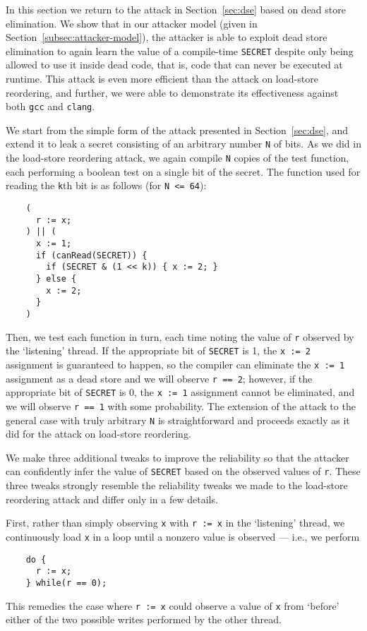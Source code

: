In this section we return to the attack in Section~\ref{sec:dse} based on
dead store elimination.
We show that in our attacker model (given in
Section~\ref{subsec:attacker-model}), the attacker is able to exploit dead
store elimination to again learn the value of a compile-time \verb|SECRET|
despite only being allowed to use it inside dead code, that is, code that can
never be executed at runtime.
This attack is even more efficient than the attack on load-store reordering,
and further, we were able to demonstrate its effectiveness against both
\verb|gcc| and \verb|clang|.

We start from the simple form of the attack presented in
Section~\ref{sec:dse}, and extend it to leak a secret consisting of an
arbitrary number \verb|N| of bits.
As we did in the load-store reordering attack, we again compile \verb|N| copies
of the test function, each performing a boolean test on a single bit of the
secret.
The function used for reading the \verb|k|th bit is as follows (for
\verb|N <= 64|):
\begin{verbatim}
    (
      r := x;
    ) || (
      x := 1;
      if (canRead(SECRET)) {
        if (SECRET & (1 << k)) { x := 2; }
      } else {
        x := 2;
      }
    )
\end{verbatim}
Then, we test each function in turn, each time noting the value of \verb|r|
observed by the `listening' thread.
If the appropriate bit of \verb|SECRET| is 1, the \verb|x := 2| assignment is
guaranteed to happen, so the compiler can eliminate the \verb|x := 1|
assignment as a dead store and we will observe \verb|r == 2|; however, if the
appropriate bit of \verb|SECRET| is 0, the \verb|x := 1| assignment cannot be
eliminated, and we will observe \verb|r == 1| with some probability.
The extension of the attack to the general case with truly arbitrary \verb|N|
is straightforward and proceeds exactly as it did for the attack on
load-store reordering.

We make three additional tweaks to improve the reliability so that the attacker
can confidently infer the value of \verb|SECRET| based on the observed values
of \verb|r|.
These three tweaks strongly resemble the reliability tweaks we made to the
load-store reordering attack and differ only in a few details.

First, rather than simply observing \verb|x| with \verb|r := x| in the
`listening' thread, we continuously load \verb|x| in a loop until a
nonzero value is observed --- i.e., we perform
\begin{verbatim}
    do {
      r := x;
    } while(r == 0);
\end{verbatim}
This remedies the case where \verb|r := x| could observe a value of \verb|x|
from `before' either of the two possible writes performed by the other thread.

